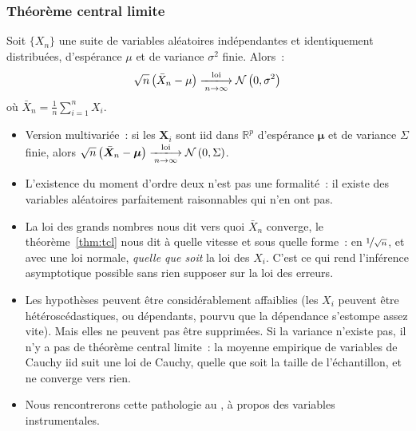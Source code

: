 \documentclass[10pt]{beamer}
\begin{document}
\begin{frame}
  \frametitle{Théorème central limite}

  \begin{theorem}\label{thm:tcl}
    Soit $\{X_n\}$ une suite de variables aléatoires indépendantes et
    identiquement distribuées, d'espérance $\mu$ et de variance $\sigma^2$
    finie. Alors~:
    \[
      \sqrt{n}\left( \bar X_n - \mu \right) \xlongrightarrow[n\rightarrow\infty]{\text{loi}} \mathcal N\left( 0,\sigma^2 \right)
    \]
    où $\bar X_n = \frac{1}{n}\sum_{i=1}^n X_i$.
  \end{theorem}

  \bigskip

  \begin{itemize}

  \item Version multivariée~: si les $\bm X_i$ sont iid dans $\mathbb R^p$
    d'espérance $\bm\mu$ et de variance $\Sigma$ finie, alors
    $\sqrt{n}\left( \bar{\bm X}_n - \bm\mu \right) \xlongrightarrow[n\rightarrow\infty]{\text{loi}} \mathcal N\left( 0,\Sigma \right)$.\newline

  \item[\dbend] L'existence du moment d'ordre deux n'est pas une formalité~: il
    existe des variables aléatoires parfaitement raisonnables qui n'en ont pas.

  \end{itemize}

\end{frame}


\begin{notes}

  \begin{itemize}

  \item La loi des grands nombres nous dit vers quoi $\bar X_n$ converge, le
    théorème~\ref{thm:tcl} nous dit à quelle vitesse et sous quelle forme~: en
    $\nicefrac{1}{\sqrt n}$, et avec une loi normale, \emph{quelle que soit} la
    loi des $X_i$. C'est ce qui rend l'inférence asymptotique possible sans rien
    supposer sur la loi des erreurs.\newline

  \item Les hypothèses peuvent être considérablement affaiblies (les $X_i$
    peuvent être hétéroscédastiques, ou dépendants, pourvu que la dépendance
    s'estompe assez vite). Mais elles ne peuvent pas être supprimées. Si la
    variance n'existe pas, il n'y a pas de théorème central limite~: la moyenne
    empirique de variables de Cauchy iid suit une loi de Cauchy, quelle que soit
    la taille de l'échantillon, et ne converge vers rien.\newline

  \item Nous rencontrerons cette pathologie au , à propos des
    variables instrumentales.

  \end{itemize}

\end{notes}
\end{document}

